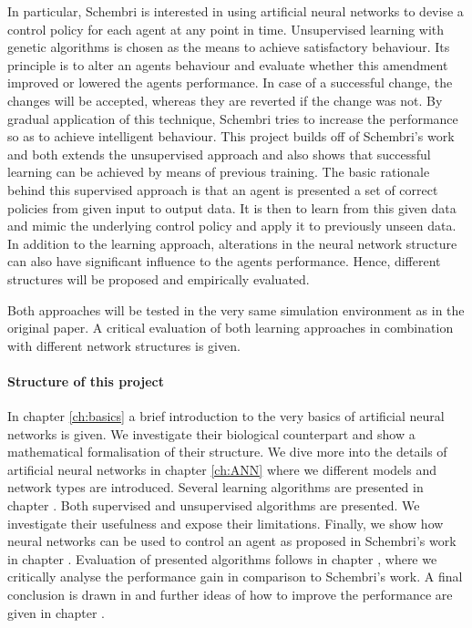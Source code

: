 \documentclass[10pt,a4paper,DIV=11]{scrreprt}
\begin{document}
In particular, Schembri is interested in using artificial neural networks to devise a control policy for each agent at any point in time. 
Unsupervised learning with genetic algorithms is chosen as the means to achieve satisfactory behaviour. Its principle is to alter 
an agents behaviour and evaluate whether this amendment improved or lowered the agents performance. In case of a successful change, the changes
will be accepted, whereas they are reverted if the change was not. By gradual application of this technique, Schembri tries to increase
the performance so as to achieve intelligent behaviour.
This project builds off of Schembri's work and both extends the unsupervised approach and also shows that successful learning can be 
achieved by means of previous training. The basic rationale behind this supervised approach is that an agent is presented a set of correct 
policies from given input to output data. It is then to learn from this given data and mimic the underlying control policy and apply it to
previously unseen data. In addition to the learning approach, alterations in the neural network structure can also have significant influence
to the agents performance. Hence, different structures will be proposed and empirically evaluated.

Both approaches will be tested in the very same simulation environment as in the original paper. A critical evaluation of both learning approaches
in combination with different network structures is given.

\paragraph{Structure of this project}
In chapter \ref{ch:basics} a brief introduction to the very basics of artificial neural networks is given. We investigate their biological counterpart
and show a mathematical formalisation of their structure. We dive more into the details of artificial neural networks in chapter \ref{ch:ANN} where
we different models and network types are introduced. Several learning algorithms are presented in chapter \label{ch:learning}. Both
supervised and unsupervised algorithms are presented. We investigate their usefulness and expose their limitations. 
Finally, we show how neural networks can be used to control an agent as proposed in Schembri's work in chapter \label{ch:design}. 
Evaluation of presented algorithms follows in chapter \label{ch:eval}, where we critically analyse the performance gain in comparison to Schembri's work. A final conclusion is drawn in 
\label{ch:conclusion} and further ideas of how to improve the performance are given in chapter \label{ch:future}.
\end{document}
